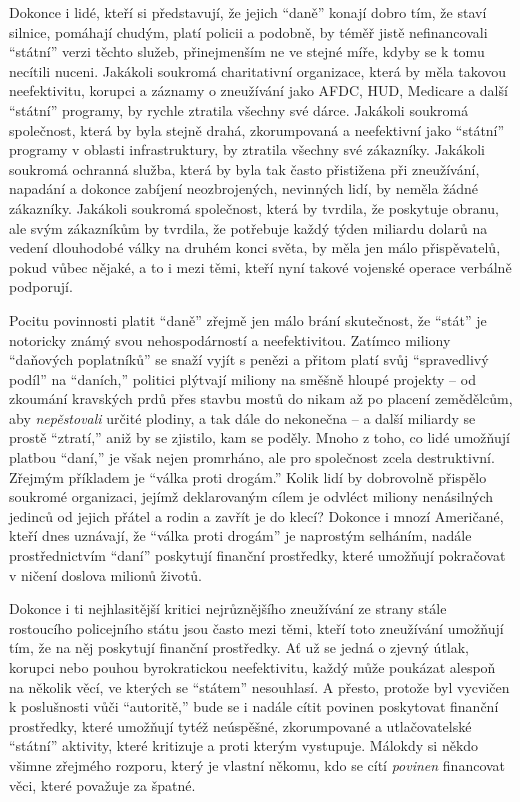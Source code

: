 \documentclass{book}
\begin{document}
Dokonce i lidé, kteří si představují, že jejich \enquote{daně} konají dobro tím, že staví silnice, pomáhají chudým, platí policii a podobně, by téměř jistě nefinancovali \enquote{státní} verzi těchto služeb, přinejmenším ne ve stejné míře, kdyby se k tomu necítili nuceni. Jakákoli soukromá charitativní organizace, která by měla takovou neefektivitu, korupci a záznamy o zneužívání jako AFDC, HUD, Medicare a další \enquote{státní} programy, by rychle ztratila všechny své dárce. Jakákoli soukromá společnost, která by byla stejně drahá, zkorumpovaná a neefektivní jako \enquote{státní} programy v oblasti infrastruktury, by ztratila všechny své zákazníky. Jakákoli soukromá ochranná služba, která by byla tak často přistižena při zneužívání, napadání a dokonce zabíjení neozbrojených, nevinných lidí, by neměla žádné zákazníky. Jakákoli soukromá společnost, která by tvrdila, že poskytuje obranu, ale svým zákazníkům by tvrdila, že potřebuje každý týden miliardu dolarů na vedení dlouhodobé války na druhém konci světa, by měla jen málo přispěvatelů, pokud vůbec nějaké, a to i mezi těmi, kteří nyní takové vojenské operace verbálně podporují.

Pocitu povinnosti platit \enquote{daně} zřejmě jen málo brání skutečnost, že \enquote{stát} je notoricky známý svou nehospodárností a neefektivitou. Zatímco miliony \enquote{daňových poplatníků} se snaží vyjít s penězi a přitom platí svůj \enquote{spravedlivý podíl} na \enquote{daních,} politici plýtvají miliony na směšně hloupé projekty -- od zkoumání kravských prdů přes stavbu mostů do nikam až po placení zemědělcům, aby \emph{nepěstovali} určité plodiny, a tak dále do nekonečna -- a další miliardy se prostě \enquote{ztratí,} aniž by se zjistilo, kam se poděly. Mnoho z toho, co lidé umožňují platbou \enquote{daní,} je však nejen promrháno, ale pro společnost zcela destruktivní. Zřejmým příkladem je \enquote{válka proti drogám.} Kolik lidí by dobrovolně přispělo soukromé organizaci, jejímž deklarovaným cílem je odvléct miliony nenásilných jedinců od jejich přátel a rodin a zavřít je do klecí? Dokonce i mnozí Američané, kteří dnes uznávají, že \enquote{válka proti drogám} je naprostým selháním, nadále prostřednictvím \enquote{daní} poskytují finanční prostředky, které umožňují pokračovat v ničení doslova milionů životů.

Dokonce i ti nejhlasitější kritici nejrůznějšího zneužívání ze strany stále rostoucího policejního státu jsou často mezi těmi, kteří toto zneužívání umožňují tím, že na něj poskytují finanční prostředky. Ať už se jedná o zjevný útlak, korupci nebo pouhou byrokratickou neefektivitu, každý může poukázat alespoň na několik věcí, ve kterých se \enquote{státem} nesouhlasí. A přesto, protože byl vycvičen k poslušnosti vůči \enquote{autoritě,} bude se i nadále cítit povinen poskytovat finanční prostředky, které umožňují tytéž neúspěšné, zkorumpované a utlačovatelské \enquote{státní} aktivity, které kritizuje a proti kterým vystupuje. Málokdy si někdo všimne zřejmého rozporu, který je vlastní někomu, kdo se cítí \emph{povinen} financovat věci, které považuje za špatné.
\end{document}
